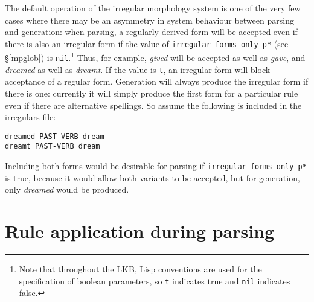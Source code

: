 \documentclass[12pt]{report}
\begin{document}
The default operation of the irregular morphology system is 
one of the very few cases where there may be an asymmetry in system
behaviour between parsing and generation: when parsing, 
a regularly derived form will be accepted even if there
is also an irregular form if the value of 
{\tt *irregular-forms-only-p*} (see \S\ref{mpglob}) is 
{\tt nil}.\footnote{Note that throughout the
LKB, Lisp conventions are used
for the specification of boolean parameters, so {\tt t} indicates
true and {\tt nil} indicates false.}
Thus, for example, {\it gived} will be accepted as well as {\it gave},
and {\it dreamed} as well as {\it dreamt}.  If the value is {\tt t},
an irregular form will block acceptance of a regular form.
Generation will always produce the irregular form if there is one:
currently it will simply produce the first form for a particular rule
even if there are alternative spellings.  So assume the following
is included in the irregulars file:
\begin{verbatim}
dreamed PAST-VERB dream
dreamt PAST-VERB dream
\end{verbatim}
Including both forms would be desirable for parsing if
{\tt *irregular-forms-only-p*} is true, because it would allow 
both variants to be accepted, but for generation, only {\it dreamed}
would be produced.


\section{Rule application during parsing}
\label{parse}
\end{document}

